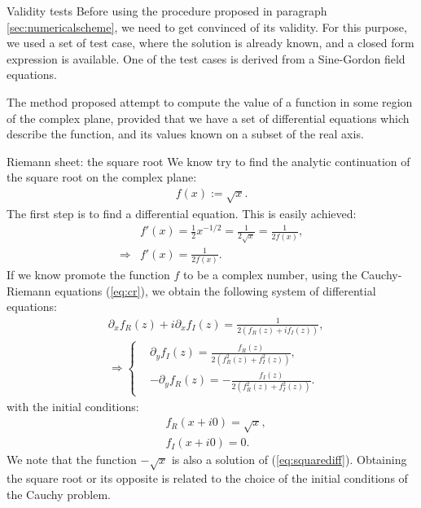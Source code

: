 \begin{section}{Validity tests}
  Before using the procedure proposed in paragraph
  \ref{sec:numericalscheme}, we need to get convinced of its
  validity. For this purpose, we used a set of test case, where the
  solution is already known, and a closed form expression is
  available. One of the test cases is derived from a Sine-Gordon field
  equations.
  
  The method proposed attempt to compute the value of a function in
  some region of the complex plane, provided that we have a set of
  differential equations which describe the function, and its values
  known on a subset of the real axis.
  \begin{subsection}{Riemann sheet: the square root}
    We know try to find the analytic continuation of the square root
    on the complex plane:
    \begin{align}
      f(x) := \sqrt{x}.
    \end{align}
    The first step is to find a differential equation. This is easily achieved:
    \begin{align}
      &f'(x) = \frac{1}{2}x^{-1/2} = \frac{1}{2\sqrt{x}} = \frac{1}{2f(x)},\\
      \Rightarrow &f'(x) = \frac{1}{2f(x)}.\label{eq:squarediff}
    \end{align}
    If we know promote the function $f$ to be a complex number, using
    the Cauchy-Riemann equations (\ref{eq:cr}), we obtain the
    following system of differential equations:
    \begin{align}
      &\partial_xf_R(z)+i\partial_xf_I(z) = \frac{1}{2(f_R(z)+if_I(z))},\\
      &\Rightarrow 
      \left\{
      \begin{aligned}        
        &\partial_yf_I(z) = \frac{f_R(z)}{2(f_R^2(z)+f_I^2(z))},\\
        &-\partial_yf_R(z) = -\frac{f_I(z)}{2(f_R^2(z)+f_I^2(z))}.
      \end{aligned}
      \right.
    \end{align}
    with the initial conditions:
    \begin{align}
      &f_R(x+i0) = \sqrt{x},\\
      &f_I(x+i0) = 0.
    \end{align}
    We note that the function $-\sqrt{x}$ is also a solution of
    (\ref{eq:squarediff}). Obtaining the square root or its opposite
    is related to the choice of the initial conditions of the Cauchy
    problem.
    

\end{subsection}
\end{section}
